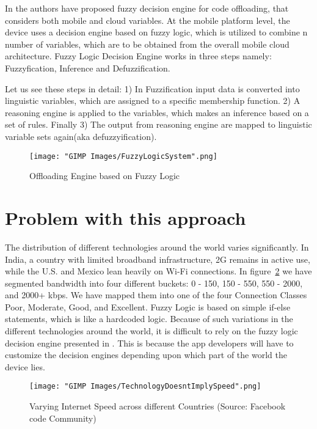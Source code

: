 \documentclass{report}
\begin{document}
In \cite{flores2013adaptive} the authors have proposed fuzzy decision engine for code offloading, that considers both mobile and cloud variables. At the mobile platform level, the device uses a decision engine based on fuzzy logic, which is utilized to
combine n number of variables, which are to be obtained from the overall mobile cloud architecture. Fuzzy
Logic Decision Engine works in three steps namely: Fuzzyfication, Inference and Defuzzification. 

Let us see these steps in detail:
1) In Fuzzification input data is converted into linguistic variables, which are assigned to a specific
membership function. 2) A reasoning engine is applied to the variables, which makes an inference based on
a set of rules. Finally 3) The output from reasoning engine are mapped to linguistic variable sets again(aka
defuzzyification).
\begin{figure}[h]
  \centering
  \texttt{[image: "GIMP Images/FuzzyLogicSystem".png]}
  \caption{Offloading Engine based on Fuzzy Logic}
  \label{fig:FuzzyLogicSystem}
\end{figure}

\section{Problem with this approach}
The distribution of different technologies around the world varies significantly. In India, a country with
limited broadband infrastructure, 2G remains in active use, while the U.S. and Mexico lean heavily on
Wi-Fi connections. In figure~\ref{fig:TechnologyDoesntImplySpeed} we have segmented bandwidth into four different buckets: 0 - 150, 150 - 550, 550 - 2000, and 2000+ kbps. We have mapped them into one of the four Connection Classes Poor,
Moderate, Good, and Excellent.
Fuzzy Logic is based on simple if-else statements, which is like a hardcoded logic. Because of such
variations in the different technologies around the world, it is difficult to rely on the fuzzy logic decision
engine presented in \cite{flores2013adaptive}. This is because the app developers will have to customize the decision engines
depending upon which part of the world the device lies.
\begin{figure}[h]
  \centering
  \texttt{[image: "GIMP Images/TechnologyDoesntImplySpeed".png]}
  \caption{Varying Internet Speed across different Countries (Source: Facebook code Community)}
  \label{fig:TechnologyDoesntImplySpeed}
\end{figure}
\end{document}
